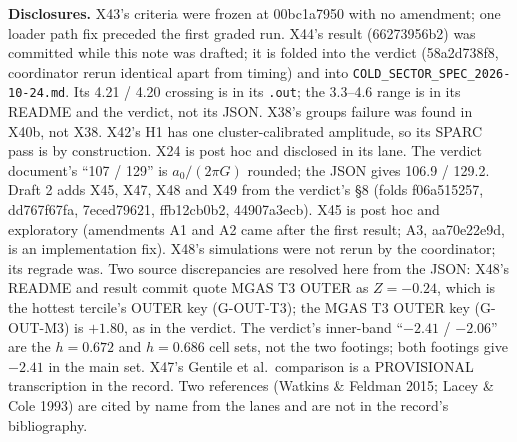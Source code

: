 \documentclass[10pt]{article}
\begin{document}
\textbf{Disclosures.} X43's criteria were frozen at 00bc1a7950 with no amendment; one loader path fix preceded the first graded run. X44's result (66273956b2) was committed while this note was drafted; it is folded into the verdict (58a2d738f8, coordinator rerun identical apart from timing) and into \texttt{COLD\_SECTOR\_SPEC\_2026-10-24.md}. Its 4.21 / 4.20 crossing is in its \texttt{.out}; the 3.3--4.6 range is in its README and the verdict, not its JSON. X38's groups failure was found in X40b, not X38. X42's H1 has one cluster-calibrated amplitude, so its SPARC pass is by construction. X24 is post hoc and disclosed in its lane. The verdict document's ``107 / 129'' is $a_0/(2\pi G)$ rounded; the JSON gives 106.9 / 129.2. Draft 2 adds X45, X47, X48 and X49 from the verdict's \S8 (folds f06a515257, dd767f67fa, 7eced79621, ffb12cb0b2, 44907a3ecb). X45 is post hoc and exploratory (amendments A1 and A2 came after the first result; A3, aa70e22e9d, is an implementation fix). X48's simulations were not rerun by the coordinator; its regrade was. Two source discrepancies are resolved here from the JSON: X48's README and result commit quote MGAS T3 OUTER as $Z=-0.24$, which is the hottest tercile's OUTER key (G-OUT-T3); the MGAS T3 OUTER key (G-OUT-M3) is $+1.80$, as in the verdict. The verdict's inner-band ``$-2.41$ / $-2.06$'' are the $h=0.672$ and $h=0.686$ cell sets, not the two footings; both footings give $-2.41$ in the main set. X47's Gentile et al.\ comparison is a PROVISIONAL transcription in the record. Two references (Watkins \& Feldman 2015; Lacey \& Cole 1993) are cited by name from the lanes and are not in the record's bibliography.
\end{document}
